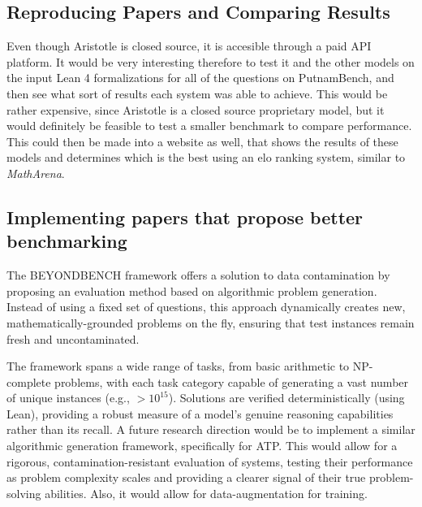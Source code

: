 \documentclass[12pt, letterpaper]{article}
\begin{document}
\subsection{Reproducing Papers and Comparing Results}

Even though Aristotle is closed source, it is accesible through a paid API platform. It would be very interesting therefore to test it and the other models on the input Lean 4 formalizations for all of the questions on PutnamBench, and then see what sort of results each system was able to achieve. This would be rather expensive, since Aristotle is a closed source proprietary model, but it would definitely be feasible to test a smaller benchmark to compare performance. This could then be made into a website as well, that shows the results of these models and determines which is the best using an elo ranking system, similar to \textit{MathArena}.

\subsection{Implementing papers that propose better benchmarking}
The BEYONDBENCH framework \citet{srivastava2025beyondbenchbenchmarkfreeevaluationreasoning} offers a solution to data contamination by proposing an evaluation method based on algorithmic problem generation. Instead of using a fixed set of questions, this approach dynamically creates new, mathematically-grounded problems on the fly, ensuring that test instances remain fresh and uncontaminated.

The framework spans a wide range of tasks, from basic arithmetic to NP-complete problems, with each task category capable of generating a vast number of unique instances (e.g., $> 10^{15}$). Solutions are verified deterministically (using Lean), providing a robust measure of a model's genuine reasoning capabilities rather than its recall. A future research direction would be to implement a similar algorithmic generation framework, specifically for ATP. This would allow for a rigorous, contamination-resistant evaluation of systems, testing their performance as problem complexity scales and providing a clearer signal of their true problem-solving abilities. Also, it would allow for data-augmentation for training.

\medskip

\newpage
\end{document}
